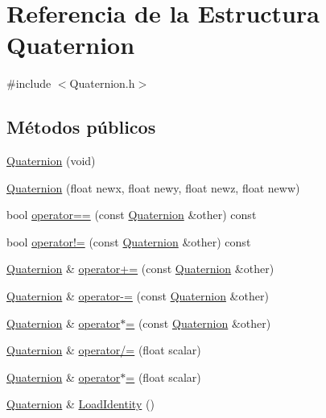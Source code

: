 \hypertarget{struct_quaternion}{
\section{Referencia de la Estructura Quaternion}
\label{struct_quaternion}
}


{\ttfamily \#include $<$Quaternion.h$>$}

\subsection*{Métodos públicos}
\begin{DoxyCompactItemize}
\item 
\hyperlink{struct_quaternion_a39a0971895c9e93ae338ed9ecbc18220}{Quaternion} (void)
\item 
\hyperlink{struct_quaternion_a68fcc1746d03661db1c44a1ef1da0ee4}{Quaternion} (float newx, float newy, float newz, float neww)
\item 
bool \hyperlink{struct_quaternion_a42082dbdbebe3a9b2cadd10a8b3f767b}{operator==} (const \hyperlink{struct_quaternion}{Quaternion} \&other) const 
\item 
bool \hyperlink{struct_quaternion_aa2b9f08ded11182532dd99af87189a5c}{operator!=} (const \hyperlink{struct_quaternion}{Quaternion} \&other) const 
\item 
\hyperlink{struct_quaternion}{Quaternion} \& \hyperlink{struct_quaternion_a72ef12aabea6b197ca0c386f8692131c}{operator+=} (const \hyperlink{struct_quaternion}{Quaternion} \&other)
\item 
\hyperlink{struct_quaternion}{Quaternion} \& \hyperlink{struct_quaternion_a682c2bc53ef117e70dd633271ddd65b4}{operator-\/=} (const \hyperlink{struct_quaternion}{Quaternion} \&other)
\item 
\hyperlink{struct_quaternion}{Quaternion} \& \hyperlink{struct_quaternion_a005233b2ecdca221e818975ef5f68d0e}{operator$\ast$=} (const \hyperlink{struct_quaternion}{Quaternion} \&other)
\item 
\hyperlink{struct_quaternion}{Quaternion} \& \hyperlink{struct_quaternion_a860018754b065c76851616d54d01cff7}{operator/=} (float scalar)
\item 
\hyperlink{struct_quaternion}{Quaternion} \& \hyperlink{struct_quaternion_a5c8d605f81f7f3ede3d6c53480752359}{operator$\ast$=} (float scalar)
\item 
\hyperlink{struct_quaternion}{Quaternion} \& \hyperlink{struct_quaternion_a31ffb4ff1cb6adb94798fd5e89fd96dd}{LoadIdentity} ()

\end{DoxyCompactItemize}
